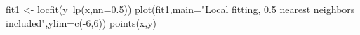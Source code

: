 \begin{Schunk}
\begin{Sinput}
 fit1 <- locfit(y~lp(x,nn=0.5)) 
 plot(fit1,main="Local fitting, 0.5 nearest neighbors included",ylim=c(-6,6))
 points(x,y)
\end{Sinput}
\end{Schunk}
